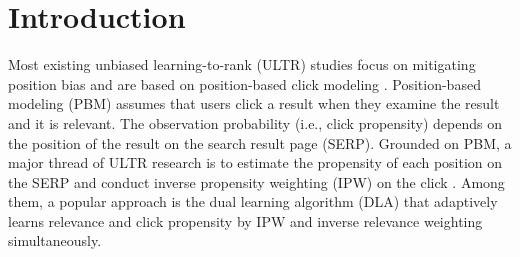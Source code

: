 \section{Introduction}

Most existing unbiased learning-to-rank (ULTR) studies focus on mitigating position bias \cite{joachims2017unbiased,ai2018unbiased,luo2024unbiased,zhang2023towards} and are based on position-based click modeling \cite{richardson2007predicting}. Position-based modeling (PBM) assumes that users click a result when they examine the result and it is relevant. The observation probability (i.e., click propensity) depends on the position of the result on the search result page (SERP). Grounded on PBM, a major thread of ULTR research is to estimate the propensity of each position on the SERP and conduct inverse propensity weighting (IPW) on the click \cite{joachims2017unbiased,ai2018unbiased,luo2024unbiased}. Among them, a popular approach is the dual learning algorithm (DLA) \cite{ai2018unbiased} that adaptively learns relevance and click propensity by IPW and inverse relevance weighting simultaneously.


